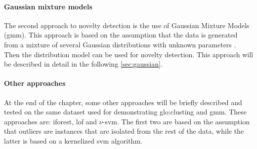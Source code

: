 \paragraph[]{Gaussian mixture models}
The second approach to novelty detection is the use of Gaussian Mixture Models (\gls{gmm}). This approach is based on the assumption that the data is generated from a mixture of several Gaussian distributions with unknown parameters . Then the distribution model can be used for novelty detection. This approach will be described in detail in the following \autoref{sec:gaussian}.

\paragraph{Other approaches}
At the end of the chapter, some other approaches will be briefly described and tested on the same dataset used for demonstrating \gls{glo:clust}ing and \gls{gmm}. These approaches are: \gls{iforest}, \gls{lof} and $\nu$-\gls{svm}. The first two are based on the assumption that outliers are instances that are isolated from the rest of the data, while the latter is based on a kernelized \gls{svm} algorithm. 







